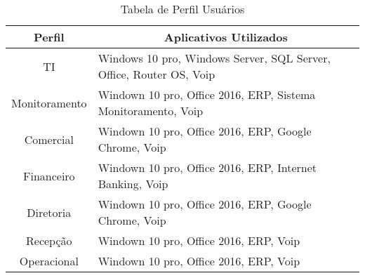 \begin{table}[h!] %
	\centering
	\caption{Tabela de Perfil Usuários}
	\label{TabPerfilUsuarios} %
\begin{tabular}{|c|l|}
	\hline
	\textbf{Perfil} & \multicolumn{1}{c|}{\textbf{Aplicativos Utilizados}}                \\ \hline
	TI              & Windows 10 pro, Windows Server, SQL Server, Office, Router OS, Voip \\ \hline
	Monitoramento   & Windown 10 pro, Office 2016, ERP, Sistema Monitoramento, Voip       \\ \hline
	Comercial       & Windown 10 pro, Office 2016, ERP, Google Chrome, Voip               \\ \hline
	Financeiro      & Windown 10 pro, Office 2016, ERP, Internet Banking, Voip            \\ \hline
	Diretoria       & Windown 10 pro, Office 2016, ERP, Google Chrome, Voip               \\ \hline
	Recepção        & Windown 10 pro, Office 2016, ERP, Voip                              \\ \hline
	Operacional     & Windown 10 pro, Office 2016, ERP, Voip                              \\ \hline
\end{tabular}
\end{table}